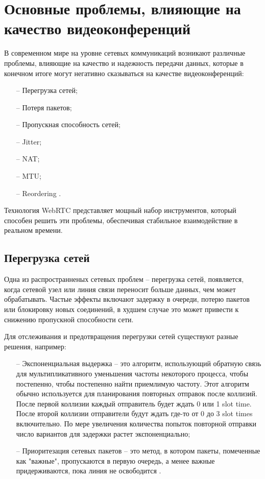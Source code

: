 \section{Основные проблемы, влияющие на качество видеоконференций}

В современном мире на уровне сетевых коммуникаций возникают различные проблемы, влияющие на качество и надежность передачи данных, которые в конечном итоге могут негативно сказываться на качестве видеоконференций:
\begin{itemize}
	\item[--] Перегрузка сетей;
	\item[--] Потеря пакетов;
        \item[--] Пропускная способность сетей;
        \item[--] Jitter;
        \item[--] NAT;
        \item[--] MTU;
        \item[--] Reordering \cite{v4}.
\end{itemize}

Технология WebRTC представляет мощный набор инструментов, который способен решить эти проблемы, обеспечивая стабильное взаимодействие в реальном времени.

\subsection{Перегрузка сетей}

Одна из распространненых сетевых проблем -- перегрузка сетей, появляется, когда сетевой узел или линия связи переносит больше данных, чем может обрабатывать. Частые эффекты включают задержку в очереди, потерю пакетов или блокировку новых соединений, в худшем случае это может привести к снижению пропускной способности сети.

Для отслеживания и предотвращения перегрузки сетей существуют разные решения, например:
\begin{itemize}
	\item[--] Экспоненциальная выдержка -- это алгоритм, использующий обратную связь для мультипликативного уменьшения частоты некоторого процесса, чтобы постепенно, чтобы постепенно найти приемлимую частоту. Этот алгоритм обычно используется для планирования повторных отправок после коллизий. После первой коллизии каждый отправитель будет ждать 0 или 1 slot time. После второй коллизии отправители будут ждать где-то от 0 до 3 slot times включительно. По мере увеличения количества попыток повторной отправки число вариантов для задержки растет экспоненциально;
        \item[--] Приоритезация сетевых пакетов -- это метод, в котором пакеты, помеченные как "важные", пропускаются в первую очередь, а менее важные придерживаются, пока линия не освободится \cite{v11}.
\end{itemize}


